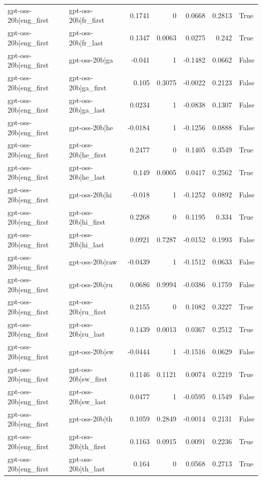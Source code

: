 \begin{table}
\begin{tabular}{l l r r r r l}
gpt-oss-20b|eng_first & gpt-oss-20b|fr_first & 0.1741 & 0 & 0.0668 & 0.2813 & True \\
gpt-oss-20b|eng_first & gpt-oss-20b|fr_last & 0.1347 & 0.0063 & 0.0275 & 0.242 & True \\
gpt-oss-20b|eng_first & gpt-oss-20b|ga & -0.041 & 1 & -0.1482 & 0.0662 & False \\
gpt-oss-20b|eng_first & gpt-oss-20b|ga_first & 0.105 & 0.3075 & -0.0022 & 0.2123 & False \\
gpt-oss-20b|eng_first & gpt-oss-20b|ga_last & 0.0234 & 1 & -0.0838 & 0.1307 & False \\
gpt-oss-20b|eng_first & gpt-oss-20b|he & -0.0184 & 1 & -0.1256 & 0.0888 & False \\
gpt-oss-20b|eng_first & gpt-oss-20b|he_first & 0.2477 & 0 & 0.1405 & 0.3549 & True \\
gpt-oss-20b|eng_first & gpt-oss-20b|he_last & 0.149 & 0.0005 & 0.0417 & 0.2562 & True \\
gpt-oss-20b|eng_first & gpt-oss-20b|hi & -0.018 & 1 & -0.1252 & 0.0892 & False \\
gpt-oss-20b|eng_first & gpt-oss-20b|hi_first & 0.2268 & 0 & 0.1195 & 0.334 & True \\
gpt-oss-20b|eng_first & gpt-oss-20b|hi_last & 0.0921 & 0.7287 & -0.0152 & 0.1993 & False \\
gpt-oss-20b|eng_first & gpt-oss-20b|raw & -0.0439 & 1 & -0.1512 & 0.0633 & False \\
gpt-oss-20b|eng_first & gpt-oss-20b|ru & 0.0686 & 0.9994 & -0.0386 & 0.1759 & False \\
gpt-oss-20b|eng_first & gpt-oss-20b|ru_first & 0.2155 & 0 & 0.1082 & 0.3227 & True \\
gpt-oss-20b|eng_first & gpt-oss-20b|ru_last & 0.1439 & 0.0013 & 0.0367 & 0.2512 & True \\
gpt-oss-20b|eng_first & gpt-oss-20b|sw & -0.0444 & 1 & -0.1516 & 0.0629 & False \\
gpt-oss-20b|eng_first & gpt-oss-20b|sw_first & 0.1146 & 0.1121 & 0.0074 & 0.2219 & True \\
gpt-oss-20b|eng_first & gpt-oss-20b|sw_last & 0.0477 & 1 & -0.0595 & 0.1549 & False \\
gpt-oss-20b|eng_first & gpt-oss-20b|th & 0.1059 & 0.2849 & -0.0014 & 0.2131 & False \\
gpt-oss-20b|eng_first & gpt-oss-20b|th_first & 0.1163 & 0.0915 & 0.0091 & 0.2236 & True \\
gpt-oss-20b|eng_first & gpt-oss-20b|th_last & 0.164 & 0 & 0.0568 & 0.2713 & True \\

\end{tabular}
\end{table}
